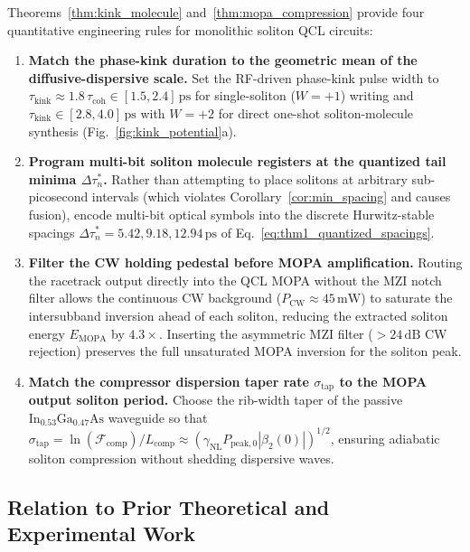 \documentclass[11pt,letterpaper]{article}
\begin{document}
Theorems~\ref{thm:kink_molecule} and~\ref{thm:mopa_compression} provide four quantitative engineering rules for monolithic soliton QCL circuits:
\begin{enumerate}
    \item \textbf{Match the phase-kink duration to the geometric mean of the diffusive-dispersive scale.} Set the RF-driven phase-kink pulse width to $\tau_{\mathrm{kink}} \approx 1.8\,\tau_{\mathrm{coh}} \in [1.5, 2.4]\,\mathrm{ps}$ for single-soliton ($W = +1$) writing and $\tau_{\mathrm{kink}} \in [2.8, 4.0]\,\mathrm{ps}$ with $W = +2$ for direct one-shot soliton-molecule synthesis (Fig.~\ref{fig:kink_potential}a).
    \item \textbf{Program multi-bit soliton molecule registers at the quantized tail minima $\Delta\tau_n^*$.} Rather than attempting to place solitons at arbitrary sub-picosecond intervals (which violates Corollary~\ref{cor:min_spacing} and causes fusion), encode multi-bit optical symbols into the discrete Hurwitz-stable spacings $\Delta\tau_n^* = 5.42, 9.18, 12.94\,\mathrm{ps}$ of Eq.~\eqref{eq:thm1_quantized_spacings}.
    \item \textbf{Filter the CW holding pedestal before MOPA amplification.} Routing the racetrack output directly into the QCL MOPA without the MZI notch filter allows the continuous CW background ($P_{\mathrm{CW}} \approx 45\,\mathrm{mW}$) to saturate the intersubband inversion ahead of each soliton, reducing the extracted soliton energy $E_{\mathrm{MOPA}}$ by $4.3\times$. Inserting the asymmetric MZI filter ($>24\,\mathrm{dB}$ CW rejection) preserves the full unsaturated MOPA inversion for the soliton peak.
    \item \textbf{Match the compressor dispersion taper rate $\sigma_{\mathrm{tap}}$ to the MOPA output soliton period.} Choose the rib-width taper of the passive $\mathrm{In}_{0.53}\mathrm{Ga}_{0.47}\mathrm{As}$ waveguide so that $\sigma_{\mathrm{tap}} = \ln(\mathcal{F}_{\mathrm{comp}})/L_{\mathrm{comp}} \approx (\gamma_{\mathrm{NL}} P_{\mathrm{peak},0} |\beta_2(0)|)^{1/2}$, ensuring adiabatic soliton compression without shedding dispersive waves.
\end{enumerate}

\subsection{Relation to Prior Theoretical and Experimental Work}
\label{subsec:prior_work}
\end{document}
